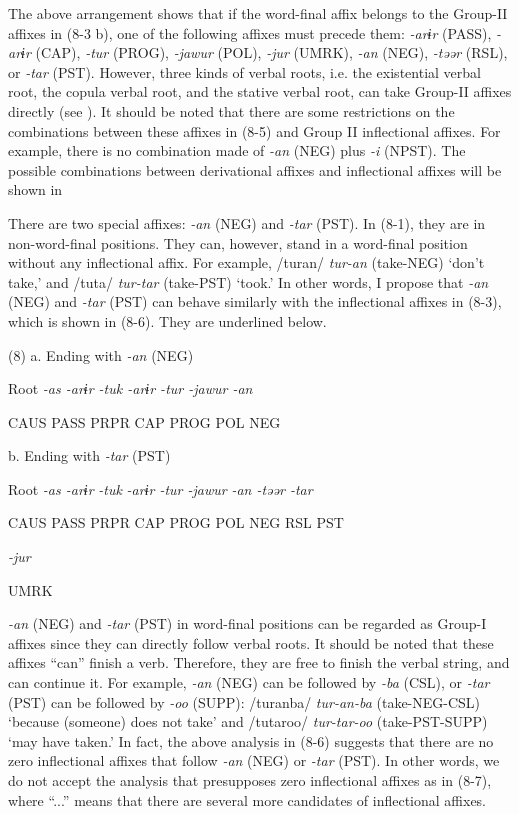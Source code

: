 The above arrangement shows that if the word-final affix belongs to the Group-II affixes in (8-3 b), one of the following affixes must precede them: \textit{{}-arɨr} (PASS), \textit{-arɨr} (CAP), \textit{-tur} (PROG), \textit{{}-jawur} (POL), \textit{{}-jur} (UMRK), \textit{{}-an} (NEG), \textit{{}-təər} (RSL), or \textit{{}-tar} (PST). However, three kinds of verbal roots, i.e. the existential verbal root, the copula verbal root, and the stative verbal root, can take Group-II affixes directly (see ). It should be noted that there are some restrictions on the combinations between these affixes in (8-5) and Group II inflectional affixes. For example, there is no combination made of \textit{{}-an} (NEG) plus \textit{{}-i} (NPST). The possible combinations between derivational affixes and inflectional affixes will be shown in 

There are two special affixes: \textit{{}-an} (NEG) and \textit{-tar} (PST). In (8-1), they are in non-word-final positions. They can, however, stand in a word-final position without any inflectional affix. For example, /turan/ \textit{tur-an} (take-NEG) ‘don’t take,’ and /tuta/ \textit{tur-tar} (take-PST) ‘took.’ In other words, I propose that \textit{{}-an} (NEG) and \textit{-tar} (PST) can behave similarly with the inflectional affixes in (8-3), which is shown in (8-6). They are underlined below.

(8)  a.  Ending with \textit{{}-an} (NEG)

    Root  \textit{{}-as  {}-arɨr  {}-tuk  {}-arɨr  {}-tur  {}-jawur  {}-an}   

      CAUS  PASS  PRPR  CAP  PROG  POL  NEG    

  b.  Ending with \textit{{}-tar} (PST)

    Root  \textit{{}-as  {}-arɨr} %
\textit{{}-tuk}  \textit{{}-arɨr  {}-tur  {}-jawur} %
\textit{{}-an  {}-təər  {}-tar}

      CAUS  PASS  PRPR  CAP  PROG  POL  NEG  RSL  PST

            \textit{{}-jur} 

            UMRK  

\textit{{}-an} (NEG) and \textit{{}-tar} (PST) in word-final positions can be regarded as Group-I affixes since they can directly follow verbal roots. It should be noted that these affixes “can” finish a verb. Therefore, they are free to finish the verbal string, and can continue it. For example, \textit{{}-an} (NEG) can be followed by \textit{{}-ba} (CSL), or \textit{{}-tar} (PST) can be followed by \textit{{}-oo} (SUPP): /turanba/ \textit{tur-an-ba} (take-NEG-CSL) ‘because (someone) does not take’ and /tutaroo/ \textit{tur-tar-oo} (take-PST-SUPP) ‘may have taken.’ In fact, the above analysis in (8-6) suggests that there are no zero inflectional affixes that follow \textit{{}-an} (NEG) or \textit{{}-tar} (PST). In other words, we do not accept the analysis that presupposes zero inflectional affixes as in (8-7), where “...” means that there are several more candidates of inflectional affixes.

